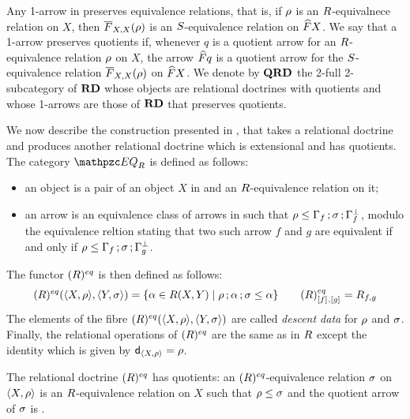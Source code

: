 Any 1-arrow   in \RDtn 
preserves equivalence relations, that is, 
if $\rho$ is an $R$-equivalnece relation on $X$, then $\overline{F}_{X,X}(\rho)$ is an $S$-equivalence relation on $\widehat{F}X$. 
% 
We say that a 1-arrow  preserves quotients if, 
whenever $q$ is a quotient arrow for an $R$-equivalence relation $\rho$ on $X$, the arrow $\widehat{F}q$ is a quotient arrow for the $S$-equivalence relation $\overline{F}_{X,X}(\rho)$ on $\widehat{F}X$. 
% 
We denote by $\mathbf{QRD}$ the 2-full 2-subcategory of $\mathbf{RD}$ whose objects are relational doctrines with quotients and whose 1-arrows are those of $\mathbf{RD}$ that preserves quotients. 

We now describe the construction presented in \cite{DagninoP23, DagninoP25apal}, that takes a relational doctrine 
\fun{\RDoc}{\bop\CC}{\Pos} and produces another relational doctrine 
\fun{\EQR\RDoc}{\bop{\EQC\RDoc}}{\Pos} which is extensional and has quotients. 
% 
The category $\EQC\RDoc$ is defined as follows: 
\begin{itemize}
\item an object is a pair  of an object $X$ in \CC and an $R$-equivalence relation on it; 
\item an arrow  is an equivalence class of arrows  in \CC such that $\rho \leq \Gamma_{f}\mathop{\mathbf{;}}\sigma\mathop{\mathbf{;}}\Gamma_{f}^{\bot}$, modulo the equivalence reltion stating that two such arrow $f$ and $g$ are equivalent if and only if $\rho\leq\Gamma_{f}\mathop{\mathbf{;}}\sigma\mathop{\mathbf{;}}\Gamma_{g}^{\bot}$. 
\end{itemize}
The functor $(R)^{eq}$ is then defined as follows:
\[
(R)^{eq}({\langle X,\rho \rangle },{\langle Y,\sigma \rangle }) = \{ \alpha\in R(X,Y) \mid \rho\mathop{\mathbf{;}}\alpha\mathop{\mathbf{;}}\sigma\leq\alpha \}
\qquad 
(R)^{eq}_{[f]_{},[g]_{}} = R_{f,g} 
\]
The elements of the fibre $(R)^{eq}({\langle X,\rho \rangle },{\langle Y,\sigma \rangle })$ are called \emph{descent data} for $\rho$ and $\sigma$. 
% 
Finally, the relational operations of $(R)^{eq}$ are the same as in $R$ except the identity which is given by $\mathsf{d}_{{\langle X,\rho \rangle }} = \rho$. 

The relational doctrine $(R)^{eq}$ has quotients: 
an $(R)^{eq}$-equivalence relation $\sigma$ on ${\langle X,\rho \rangle }$ is  an $R$-equivalence relation on $X$ such that $\rho\leq\sigma$ and the quotient arrow of $\sigma$ is . 



